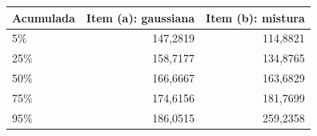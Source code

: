 \begin{tabular}{lrr}
\toprule
Acumulada & Item (a): gaussiana & Item (b): mistura \\
\midrule
5\% & 147,2819 & 114,8821 \\
25\% & 158,7177 & 134,8765 \\
50\% & 166,6667 & 163,6829 \\
75\% & 174,6156 & 181,7699 \\
95\% & 186,0515 & 259,2358 \\
\bottomrule
\end{tabular}
